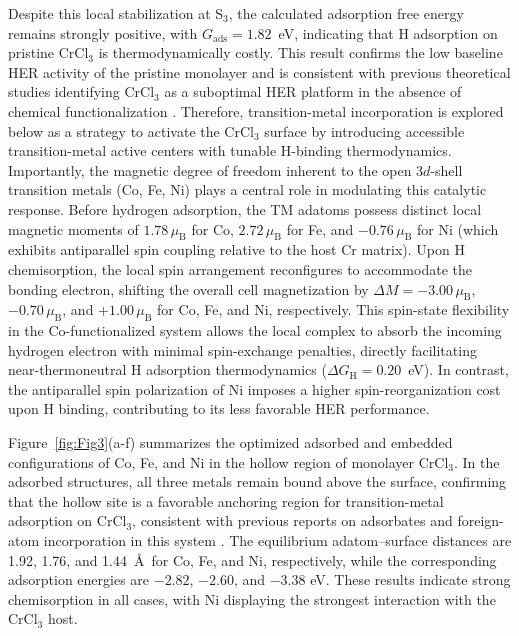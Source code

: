 \documentclass[a4paper,fleqn]{cas-dc}
\begin{document}
Despite this local stabilization at S$_3$, the calculated adsorption free energy remains strongly positive, with $G_{\mathrm{ads}} = 1.82$~eV,%
indicating that H adsorption on pristine CrCl$_3$ is thermodynamically costly. This result confirms the low baseline HER activity of the pristine monolayer and is consistent with previous theoretical studies identifying CrCl$_3$ as a suboptimal HER platform in the absence of chemical functionalization
\cite{Besbes2019,Soriano2020,Zala2024}.
Therefore, transition-metal incorporation is explored below as a strategy to activate the CrCl$_3$ surface by introducing accessible transition-metal active centers with tunable H-binding thermodynamics. Importantly, the magnetic degree of freedom inherent to the open $3d$-shell transition metals (Co, Fe, Ni) plays a central role in modulating this catalytic response. Before hydrogen adsorption, the TM adatoms possess distinct local magnetic moments of $1.78\,\mu_{\mathrm{B}}$ for Co, $2.72\,\mu_{\mathrm{B}}$ for Fe, and $-0.76\,\mu_{\mathrm{B}}$ for Ni (which exhibits antiparallel spin coupling relative to the host Cr matrix). Upon H chemisorption, the local spin arrangement reconfigures to accommodate the bonding electron, shifting the overall cell magnetization by $\Delta M = -3.00\,\mu_{\mathrm{B}}$, $-0.70\,\mu_{\mathrm{B}}$, and $+1.00\,\mu_{\mathrm{B}}$ for Co, Fe, and Ni, respectively. This spin-state flexibility in the Co-functionalized system allows the local complex to absorb the incoming hydrogen electron with minimal spin-exchange penalties, directly facilitating near-thermoneutral H adsorption thermodynamics ($\Delta G_{\mathrm{H}} = 0.20$~eV). In contrast, the antiparallel spin polarization of Ni imposes a higher spin-reorganization cost upon H binding, contributing to its less favorable HER performance.


Figure~\ref{fig:Fig3}(a-f) summarizes the optimized adsorbed and embedded configurations of Co, Fe, and Ni in the hollow region of monolayer CrCl$_3$. In the adsorbed structures, all three metals remain bound above the surface, confirming that the hollow site is a favorable anchoring region for transition-metal adsorption on CrCl$_3$, consistent with previous reports on adsorbates and foreign-atom incorporation in this system \cite{Luo2020,Luo2020a,Mastrippolito2021,Mastrippolito2022}. The equilibrium adatom--surface distances are 1.92, 1.76, and 1.44~\AA\ for Co, Fe, and Ni, respectively, while the corresponding adsorption energies are $-2.82$, $-2.60$, and $-3.38$ eV. These results indicate strong chemisorption in all cases, with Ni displaying the strongest interaction with the CrCl$_3$ host.
\end{document}
